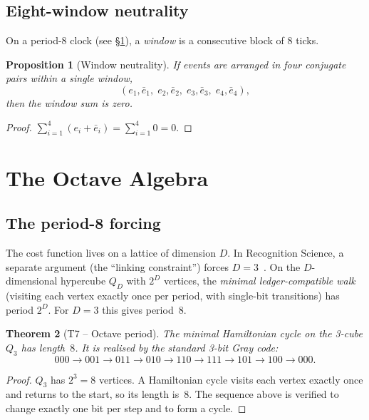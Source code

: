 \documentclass[11pt,a4paper]{article}
\theoremstyle{plain}
\newtheorem{theorem}{Theorem}[section]
\newtheorem{proposition}[theorem]{Proposition}
\theoremstyle{definition}
\theoremstyle{remark}
\begin{document}
\subsection{Eight-window neutrality}

On a period-8 clock (see \S\ref{sec:octave}), a \emph{window} is a
consecutive block of 8 ticks.

\begin{proposition}[Window neutrality]\label{prop:window}
If events are arranged in four conjugate pairs within a single window,
\[
  (e_1,\bar e_1,\;e_2,\bar e_2,\;e_3,\bar e_3,\;e_4,\bar e_4),
\]
then the window sum is zero.
\end{proposition}

\begin{proof}
$\sum_{i=1}^4(e_i+\bar e_i)=\sum_{i=1}^4 0=0$.
\end{proof}


\section{The Octave Algebra}\label{sec:octave}

\subsection{The period-8 forcing}

The cost function lives on a lattice of dimension $D$.
In Recognition Science, a separate argument (the ``linking
constraint'') forces $D=3$~\cite{washburn2025axioms}.
On the $D$-dimensional hypercube $Q_D$ with $2^D$ vertices, the
\emph{minimal ledger-compatible walk} (visiting each vertex exactly
once per period, with single-bit transitions) has period $2^D$.  For
$D=3$ this gives period~$8$.

\begin{theorem}[T7 -- Octave period]\label{thm:T7}
The minimal Hamiltonian cycle on the 3-cube $Q_3$ has length~$8$.
It is realised by the standard 3-bit Gray code:
\[
  000\to001\to011\to010\to110\to111\to101\to100\to000.
\]
\end{theorem}

\begin{proof}
$Q_3$ has $2^3=8$ vertices.  A Hamiltonian cycle visits each
vertex exactly once and returns to the start, so its length is~$8$.
The sequence above is verified to change exactly one bit per step
and to form a cycle.
\end{proof}
\end{document}
